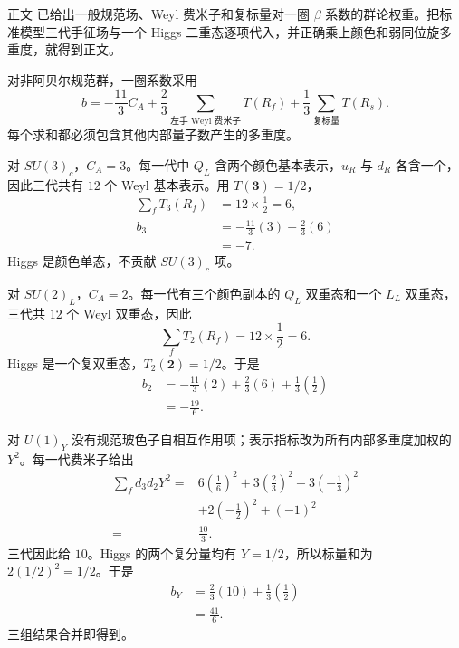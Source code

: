 \begin{derivation}
正文 已给出一般规范场、Weyl 费米子和复标量对一圈 $\beta$ 系数的群论权重。把标准模型三代手征场与一个 Higgs 二重态逐项代入，并正确乘上颜色和弱同位旋多重度，就得到正文。

对非阿贝尔规范群，一圈系数采用
\begin{equation*}
b=-\frac{11}{3}C_A
+\frac23\sum_{\text{左手 Weyl 费米子}}T(R_f)
+\frac13\sum_{\text{复标量}}T(R_s).
\end{equation*}
每个求和都必须包含其他内部量子数产生的多重度。

对 $SU(3)_c$，$C_A=3$。每一代中 $Q_L$ 含两个颜色基本表示，$u_R$ 与 $d_R$ 各含一个，因此三代共有 $12$ 个 Weyl 基本表示。用 $T(\mathbf3)=1/2$，
\begin{align*}
\sum_fT_3(R_f)&=12\times\frac12=6,\\
b_3&=-\frac{11}{3}(3)+\frac23(6)\\
&=-7.
\end{align*}
Higgs 是颜色单态，不贡献 $SU(3)_c$ 项。

对 $SU(2)_L$，$C_A=2$。每一代有三个颜色副本的 $Q_L$ 双重态和一个 $L_L$ 双重态，三代共 $12$ 个 Weyl 双重态，因此
\begin{equation*}
\sum_fT_2(R_f)=12\times\frac12=6.
\end{equation*}
Higgs 是一个复双重态，$T_2(\mathbf2)=1/2$。于是
\begin{align*}
b_2
&=-\frac{11}{3}(2)+\frac23(6)+\frac13\left(\frac12\right)\\
&=-\frac{19}{6}.
\end{align*}

对 $U(1)_Y$ 没有规范玻色子自相互作用项；表示指标改为所有内部多重度加权的 $Y^2$。每一代费米子给出
\begin{align*}
\sum_fd_3d_2Y^2
={}&6\left(\frac16\right)^2
+3\left(\frac23\right)^2
+3\left(-\frac13\right)^2\\
&+2\left(-\frac12\right)^2+(-1)^2\\
={}&\frac{10}{3}.
\end{align*}
三代因此给 $10$。Higgs 的两个复分量均有 $Y=1/2$，所以标量和为 $2(1/2)^2=1/2$。于是
\begin{align*}
b_Y
&=\frac23(10)+\frac13\left(\frac12\right)\\
&=\frac{41}{6}.
\end{align*}
三组结果合并即得到。
\end{derivation}



